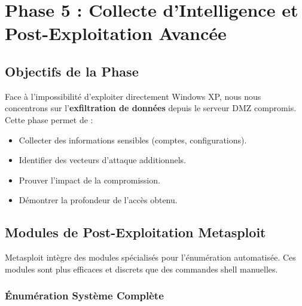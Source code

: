 \documentclass[12pt,a4paper,openany]{report}
\begin{document}

\chapter{Phase 5 : Collecte d'Intelligence et Post-Exploitation Avancée}

\section{Objectifs de la Phase}

Face à l'impossibilité d'exploiter directement Windows XP, nous nous concentrons sur l'\textbf{exfiltration de données} depuis le serveur DMZ compromis. Cette phase permet de :
\begin{itemize}
	\item Collecter des informations sensibles (comptes, configurations).
	\item Identifier des vecteurs d'attaque additionnels.
	\item Prouver l'impact de la compromission.
	\item Démontrer la profondeur de l'accès obtenu.
\end{itemize}

\section{Modules de Post-Exploitation Metasploit}

Metasploit intègre des modules spécialisés pour l'énumération automatisée. Ces modules sont plus efficaces et discrets que des commandes shell manuelles.

\subsection{Énumération Système Complète}
\end{document}
